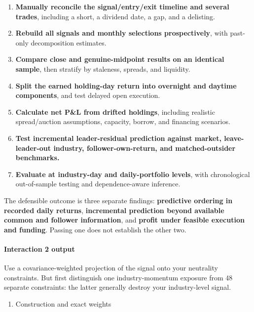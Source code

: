 \begin{enumerate}
\def\labelenumi{\arabic{enumi}.}
\tightlist
\item
  \textbf{Manually reconcile the signal/entry/exit timeline and several trades}, including a short, a dividend date, a gap, and a delisting.
\item
  \textbf{Rebuild all signals and monthly selections prospectively}, with past-only decomposition estimates.
\item
  \textbf{Compare close and genuine-midpoint results on an identical sample}, then stratify by staleness, spreads, and liquidity.
\item
  \textbf{Split the earned holding-day return into overnight and daytime components}, and test delayed open execution.
\item
  \textbf{Calculate net P\&L from drifted holdings}, including realistic spread/auction assumptions, capacity, borrow, and financing scenarios.
\item
  \textbf{Test incremental leader-residual prediction against market, leave-leader-out industry, follower-own-return, and matched-outsider benchmarks.}
\item
  \textbf{Evaluate at industry-day and daily-portfolio levels}, with chronological out-of-sample testing and dependence-aware inference.
\end{enumerate}

The defensible outcome is three separate findings: \textbf{predictive ordering in recorded daily returns}, \textbf{incremental prediction beyond available common and follower information}, and \textbf{profit under feasible execution and funding}. Passing one does not establish the other two.

\hypertarget{interaction-2-output}{%
\paragraph{Interaction 2 output}\label{interaction-2-output}}

Use a covariance-weighted projection of the signal onto your neutrality constraints. But first distinguish one industry-momentum exposure from 48 separate constraints: the latter generally destroy your industry-level signal.

\begin{enumerate}
\def\labelenumi{\arabic{enumi}.}
\tightlist
\item
  Construction and exact weights
\end{enumerate}

